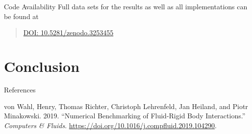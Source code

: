 \begin{frame}{Code Availability}
\protect\hypertarget{code-availability}{}
Full data sets for the results as well as all implementations can be
found at

\begin{quote}
\href{https://doi.org/10.5281/zenodo.3253455}{DOI:
10.5281/zenodo.3253455}
\end{quote}
\end{frame}

\hypertarget{conclusion}{%
\section{Conclusion}\label{conclusion}}

\begin{frame}{References}
\protect\hypertarget{references}{}
\hypertarget{refs}{}
\begin{cslreferences}
\leavevmode\hypertarget{ref-WahRLHM19}{}%
von Wahl, Henry, Thomas Richter, Christoph Lehrenfeld, Jan Heiland, and
Piotr Minakowski. 2019. ``Numerical Benchmarking of Fluid-Rigid Body
Interactions.'' \emph{Computers \& Fluids}.
\url{https://doi.org/10.1016/j.compfluid.2019.104290}.
\end{cslreferences}
\end{frame}
